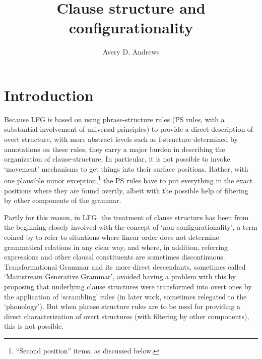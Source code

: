 \documentclass[output=paper,hidelinks]{langscibook}
\title{Clause structure and configurationality}
\author{Avery D. Andrews\affiliation{The Australian National University}}
\begin{document}
\maketitle
\label{chap:Cstr}

\section{Introduction}
Because LFG is based on using phrase-structure rules (PS rules, with a substantial
involvement of universal principles) to provide a direct
description of overt structure, with more abstract levels such as f-structure
determined by annotations on these rules, they carry a major burden in
describing the organization of clause-structure.  In particular, it is not possible
to invoke `movement' mechanisms to get things into their surface positions.  Rather,
with one plausible minor exception,\footnote
 {``Second position'' items, as discussed below.}
the PS rules have to put everything
in the exact positions where they are found overtly, albeit
with the possible help of filtering by other components of the grammar.

Partly for this reason, in LFG. the treatment of clause structure has been from the
beginning closely involved with the concept of `non-configurationality', a term coined
by \citet{Hale81} to refer to situations where linear order does not determine
grammatical relations in any clear way, and where, in addition, referring expressions
and other clausal constituents are sometimes discontinuous.  Transformational Grammar
and its more direct descendants, sometimes called `Mainstream Generative Grammar',
avoided having a problem with this by proposing that underlying clause structures were
transformed into overt ones by the application of `scrambling' rules (in later work,
sometimes relegated to the `phonology').  But when phrase structure rules are to be used
for providing a direct characterization of overt structures (with filtering by other
components), this is not possible.
\end{document}
